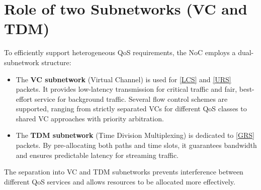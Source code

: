 \section{Role of two Subnetworks (VC and TDM)}


To efficiently support heterogeneous QoS requirements, the NoC employs a dual-subnetwork structure:

\begin{itemize}
    \item The \textbf{VC subnetwork} (Virtual Channel) is used for \ref{LCS} and \ref{URS} packets. It provides low-latency transmission for critical traffic and fair, best-effort service for background traffic. Several flow control schemes are supported, ranging from strictly separated VCs for different QoS classes to shared VC approaches with priority arbitration.
    \item The \textbf{TDM subnetwork} (Time Division Multiplexing) is dedicated to \ref{GRS} packets. By pre-allocating both paths and time slots, it guarantees bandwidth and ensures predictable latency for streaming traffic.
\end{itemize}

The separation into VC and TDM subnetworks prevents interference between different QoS services and allows resources to be allocated more effectively.
 
